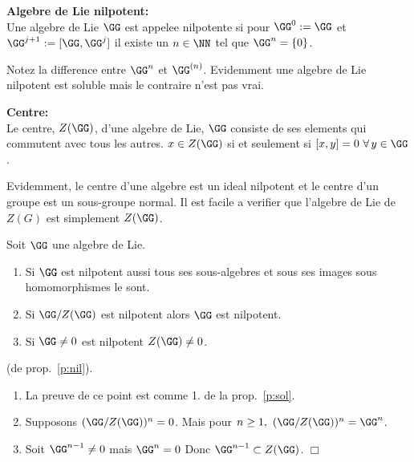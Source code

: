 \begin{ddd}{\bf Algebre de Lie nilpotent:}\\
Une algebre de Lie $\GG$ est appelee nilpotente si pour $\GG^0 :=\GG$ et $\GG^{j+1} :=[\GG,\GG^j]$
il existe un $n\in \NN$ tel que $\GG^n = \{0\}$.
\end{ddd}
Notez la difference entre $\GG^n$ et $\GG^{(n)}$. Evidemment une algebre de Lie nilpotent est 
soluble mais le contraire n'est pas vrai. 
\begin{ddd} {\bf Centre:}\\
Le centre, $Z(\GG)$, d'une algebre de Lie, $\GG$ consiste de ses elements qui commutent avec tous les autres.
$x\in Z(\GG)$ si et seulement si $[x,y]=0~\forall\, y\in \GG$.\\
\end{ddd}
Evidemment, le centre d'une algebre est un ideal nilpotent et le centre d'un groupe est un sous-groupe normal. Il est facile
a verifier que l'algebre de Lie de $Z(G)$ est simplement $Z(\GG)$.

\begin{ppp} Soit $\GG$ une algebre de Lie. \label{p:nil}
\begin{enumerate}
\item Si $\GG$ est nilpotent aussi tous ses sous-algebres et sous ses images sous homomorphismes le sont.
\item Si $\GG/Z(\GG)$ est nilpotent alors $\GG$ est nilpotent.
\item Si $\GG \neq 0$ est nilpotent $Z(\GG)\neq 0$.
\end{enumerate}
\end{ppp}
\begin{prv} (de prop.~\ref{p:nil}).
\begin{enumerate}
\item La preuve de ce point est comme 1. de la prop.~\ref{p:sol}.
\item Supposons $(\GG/Z(\GG))^{n} =0$. Mais pour $n\ge 1,~(\GG/Z(\GG))^{n} =\GG^{n}$. 
\item Soit $\GG^{n-1}\neq 0$ mais $\GG^n =0$ Donc $\GG^{n-1}\subset Z(\GG)$. \hfill $\Box$ 
\end{enumerate}
\end{prv}

